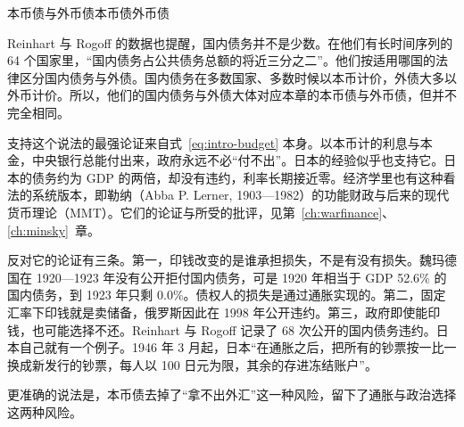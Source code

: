 \begin{compare}{本币债与外币债}{本币债}{外币债}
\end{compare}

Reinhart 与 Rogoff 的数据也提醒，国内债务并不是少数。在他们有长时间序列的 64 个国家里，“国内债务占公共债务总额的将近三分之二”\cite{reinhart2008}。他们按适用哪国的法律区分国内债务与外债。国内债务在多数国家、多数时候以本币计价，外债大多以外币计价\cite{reinhart2008}。所以，他们的国内债务与外债大体对应本章的本币债与外币债，但并不完全相同。

\begin{pitfall}
支持这个说法的最强论证来自式~\eqref{eq:intro-budget} 本身。以本币计的利息与本金，中央银行总能付出来，政府永远不必“付不出”。日本的经验似乎也支持它。日本的债务约为 GDP 的两倍，却没有违约，利率长期接近零。经济学里也有这种看法的系统版本，即勒纳（Abba P. Lerner, 1903—1982）的功能财政与后来的现代货币理论（MMT）。它们的论证与所受的批评，见第~\ref{ch:warfinance}、\ref{ch:minsky}~章。

反对它的论证有三条。第一，印钱改变的是谁承担损失，不是有没有损失。魏玛德国在 1920—1923 年没有公开拒付国内债务，可是 1920 年相当于 GDP 52.6\% 的国内债务，到 1923 年只剩 0.0\%\cite{reinhart2008}。债权人的损失是通过通胀实现的。第二，固定汇率下印钱就是卖储备，俄罗斯因此在 1998 年公开违约。第三，政府即使能印钱，也可能选择不还。Reinhart 与 Rogoff 记录了 68 次公开的国内债务违约\cite{reinhart2008}。日本自己就有一个例子。1946 年 3 月起，日本“在通胀之后，把所有的钞票按一比一换成新发行的钞票，每人以 100 日元为限，其余的存进冻结账户”\cite{reinhart2008}。

更准确的说法是，本币债去掉了“拿不出外汇”这一种风险，留下了通胀与政治选择这两种风险。
\end{pitfall}

